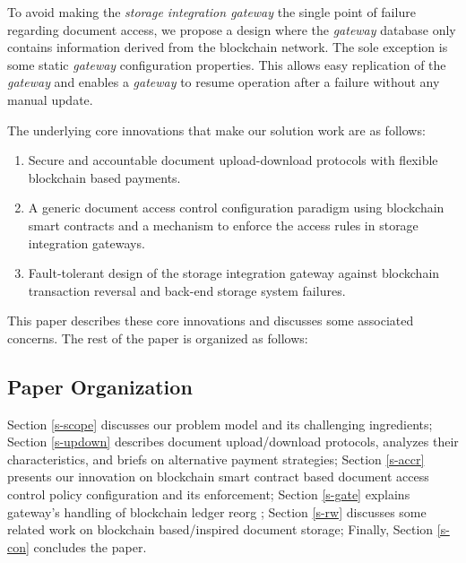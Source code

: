 To avoid making the \textit{storage integration gateway} the single point of failure regarding document access, we propose a design where the \textit{gateway} database only contains information derived from the blockchain network. The sole exception is some static \textit{gateway} configuration properties. This allows easy replication of the \textit{gateway} and enables a \textit{gateway} to resume operation after a failure without any manual update. 

The underlying core innovations that make our solution work are as follows:
\begin{enumerate}
\item Secure and accountable document upload-download protocols with flexible blockchain based payments.
\item A generic document access control configuration paradigm using blockchain smart contracts and a mechanism to enforce the access rules in storage integration gateways.
\item Fault-tolerant design of the storage integration gateway against blockchain transaction reversal and back-end storage system failures.   
\end{enumerate}         
This paper describes these core innovations and discusses some associated concerns. The rest of the paper is organized as follows:

\subsection{Paper Organization}
Section \ref{s-scope} discusses our problem model and its challenging ingredients; Section \ref{s-updown} describes document upload/download protocols, analyzes their characteristics, and briefs on alternative payment strategies; Section \ref{s-accr} presents our innovation on blockchain smart contract based document access control policy configuration and its enforcement; Section \ref{s-gate} explains gateway's handling of blockchain ledger reorg \cite{reorg}; Section \ref{s-rw} discusses some related work on blockchain based/inspired document storage; Finally, Section \ref{s-con} concludes the paper.
